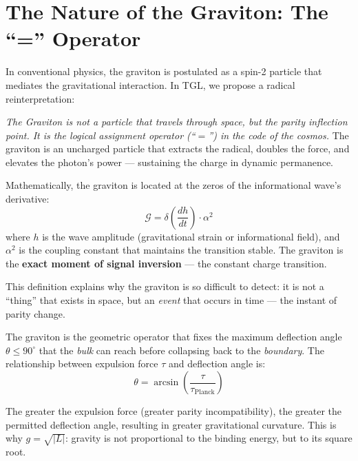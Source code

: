 \documentclass[12pt,a4paper,twoside]{article}
\newcommand{\alphaii}{\alpha^{2}}
\newcommand{\boundary}{\textit{boundary}}
\newcommand{\bulk}{\textit{bulk}}
\begin{document}

\section{The Nature of the Graviton: The ``='' Operator}


In conventional physics, the graviton is postulated as a spin-2 particle that mediates the gravitational interaction. In TGL, we propose a radical reinterpretation:

\medskip
\noindent\textit{The Graviton is not a particle that travels through space, but the parity inflection point. It is the logical assignment operator (``$=$'') in the code of the cosmos.} The graviton is an uncharged particle that extracts the radical, doubles the force, and elevates the photon's power --- sustaining the charge in dynamic permanence.

Mathematically, the graviton is located at the zeros of the informational wave's derivative:
\begin{equation}
\mathcal{G} = \delta\!\left(\frac{dh}{dt}\right) \cdot \alphaii
\label{eq:graviton}
\end{equation}
where $h$ is the wave amplitude (gravitational strain or informational field), and $\alphaii$ is the coupling constant that maintains the transition stable. The graviton is the \textbf{exact moment of signal inversion} --- the constant charge transition.

This definition explains why the graviton is so difficult to detect: it is not a ``thing'' that exists in space, but an \textit{event} that occurs in time --- the instant of parity change.

The graviton is the geometric operator that fixes the maximum deflection angle $\theta \leq 90^\circ{}$ that the \bulk{} can reach before collapsing back to the \boundary. The relationship between expulsion force $\tau$ and deflection angle is:
\begin{equation}
\theta = \arcsin\!\left(\frac{\tau}{\tau_{\text{Planck}}}\right)
\label{eq:deflexao}
\end{equation}

The greater the expulsion force (greater parity incompatibility), the greater the permitted deflection angle, resulting in greater gravitational curvature. This is why $g = \sqrt{|L|}$: gravity is not proportional to the binding energy, but to its square root.
\end{document}
